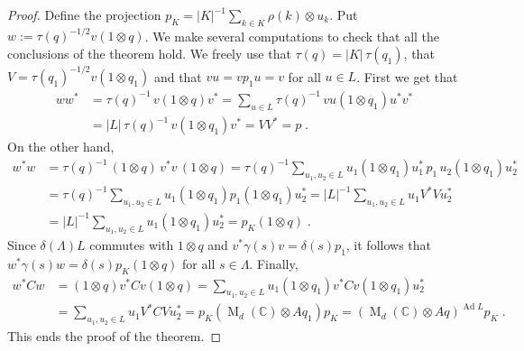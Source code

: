 \documentclass[a4paper,11pt]{amsart}
\numberwithin{equation}{section}
\begin{document}
\begin{proof}
Define the projection $p_K = |K|^{-1} \sum_{k \in K} \rho(k) {\otimes} u_k$. Put $w := \tau(q)^{-1/2} v (1 {\otimes} q)$. We make several computations to check that all the conclusions of the theorem hold. We freely use that $\tau(q) = |K|\, \tau(q_1)$, that $V = \tau(q_1)^{-1/2} v(1 {\otimes} q_1)$ and that $v u = v p_1 u = v$ for all $u \in L$. First we get that
\begin{align*}
w w^* &= \tau(q)^{-1} \, v (1 {\otimes} q) v^* = \sum_{u \in L} \tau(q)^{-1} \, v u (1 {\otimes} q_1) u^* v^* \\
&= |L| \, \tau(q)^{-1} \, v (1 {\otimes} q_1) v^* = V V^* = p \; .
\end{align*}
On the other hand,
\begin{align*}
w^* w &= \tau(q)^{-1} \, (1 {\otimes} q) \, v^* v \, (1 {\otimes} q) = \tau(q)^{-1} \sum_{u_1,u_2 \in L} u_1 (1 {\otimes} q_1) u_1^* \, p_1 \,  u_2 (1 {\otimes} q_1) u_2^* \\
&= \tau(q)^{-1} \sum_{u_1,u_2 \in L} u_1 (1 {\otimes} q_1) p_1 (1 {\otimes} q_1) u_2^* = |L|^{-1} \sum_{u_1,u_2 \in L} u_1 V^* V u_2^* \\
& = |L|^{-1} \sum_{u_1,u_2 \in L} u_1 (1 {\otimes} q_1) u_2^* = p_K (1 {\otimes} q) \; .
\end{align*}
Since $\delta(\Lambda) L$ commutes with $1 {\otimes} q$ and $v^* \gamma(s) v = \delta(s) p_1$, it follows that $w^* \gamma(s) w = \delta(s) p_K(1 {\otimes} q)$ for all $s \in \Lambda$. Finally,
\begin{align*}
w^* C w &= (1 {\otimes} q) v^* C v (1 {\otimes} q) = \sum_{u_1,u_2 \in L} u_1 (1 {\otimes} q_1) v^* C v (1 {\otimes} q_1) u_2^* \\
&= \sum_{u_1,u_2 \in L} u_1 V^* C V u_2^* = p_K ({\operatorname{M}}_d({\mathbb{C}}) {\otimes} A q_1) p_K = ({\operatorname{M}}_d({\mathbb{C}}) {\otimes} Aq)^{{\operatorname{Ad}} L} p_K \; .
\end{align*}
This ends the proof of the theorem.
\end{proof}
\end{document}
